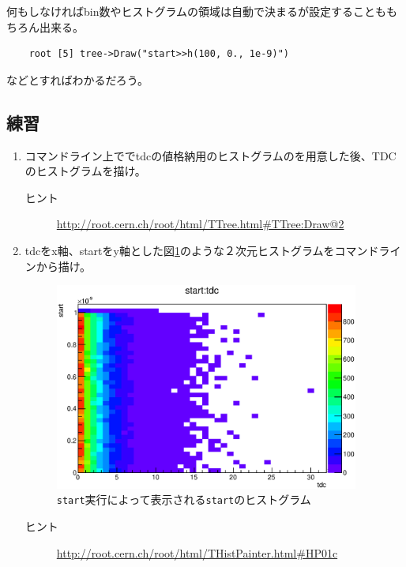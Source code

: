 \documentclass{jarticle}
\begin{document}
何もしなければbin数やヒストグラムの領域は自動で決まるが設定することももちろん出来る。
\begin{verbatim}
	root [5] tree->Draw("start>>h(100, 0., 1e-9)")
\end{verbatim}
などとすればわかるだろう。

  \subsection{練習}
  \begin{enumerate}
   \item コマンドライン上ででtdcの値格納用のヒストグラムのを用意した後、TDCのヒストグラムを描け。
	 \begin{description}
	  \item[ヒント] \url{http://root.cern.ch/root/html/TTree.html#TTree:Draw@2}
	 \end{description}
   \item tdcをx軸、startをy軸とした図\ref{Fig:meettreecanvas3}のような２次元ヒストグラムをコマンドラインから描け。
	 \begin{figure}[htbp]
	  \begin{center}
	   \includegraphics[width = 100mm]{./picture/meettreecanvas3.eps}
	  \end{center}
	  \caption{\texttt{start}実行によって表示される\texttt{start}のヒストグラム}
	  \label{Fig:meettreecanvas3}
	 \end{figure}


	 \begin{description}
	  \item[ヒント] \url{http://root.cern.ch/root/html/THistPainter.html#HP01c}
	 \end{description}
  \end{enumerate}
\end{document}
